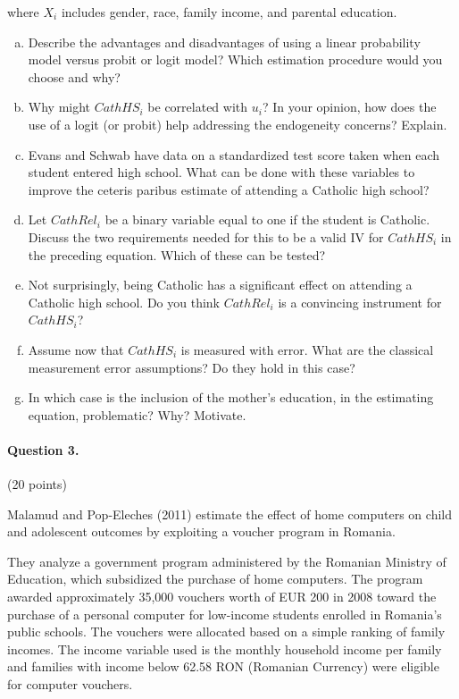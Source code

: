 \documentclass[a4paper, 12pt]{article}
\begin{document}
where $X_i$ includes gender, race, family income, and parental education.
\begin{enumerate}[(a)]
\item Describe the advantages and disadvantages of using a linear probability model versus probit or logit model? Which estimation procedure would you choose and why?
\item Why might $CathHS_{i}$ be correlated with $u_{i}$? In your opinion, how does the use of a logit (or probit) help addressing the endogeneity concerns? Explain.
\item Evans and Schwab have data on a standardized test score taken when each student entered high school. What can be done with these variables to improve the
ceteris paribus estimate of attending a Catholic high school?
\item Let $CathRel_{i}$ be a binary variable equal to one if the student is Catholic. Discuss the two requirements needed for this to be a valid IV for $CathHS_{i}$ in the preceding equation. Which of these can be tested?
\item Not surprisingly, being Catholic has a significant effect on attending a Catholic high school. Do you think $CathRel_i$ is a convincing instrument for $CathHS_{i}$?
\item Assume now that $CathHS_{i}$ is measured with error. What are the classical measurement error assumptions? Do they hold in this case? 
\item In which case is the inclusion of the mother’s education, in the estimating equation, problematic? Why? Motivate.
\end{enumerate}

\paragraph{Question 3.} (20 points)

Malamud and Pop-Eleches (2011) estimate the effect of home computers on child and adolescent outcomes by exploiting a voucher program in Romania. 

They analyze a government program administered by the Romanian Ministry of Education, which subsidized the purchase of home computers. The program awarded approximately 35,000 vouchers worth of EUR 200 in 2008 toward the purchase of a personal computer for low-income students enrolled in Romania’s public schools. The vouchers were allocated based on a simple ranking of family incomes. The income variable used is the monthly household income per family and families with income below 62.58 RON (Romanian Currency) were eligible for computer vouchers.
\end{document}
